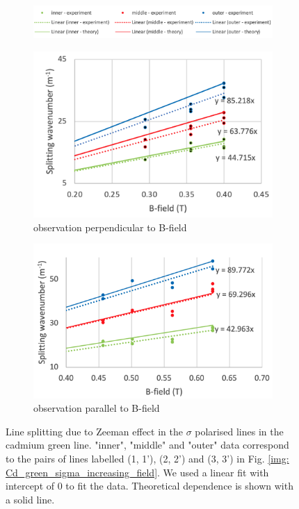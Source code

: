 \documentclass[11pt]{article}
\begin{document}
\begin{figure}[h!]
    \centering
        \begin{subfigure}{\linewidth}
        \includegraphics[width=\linewidth]{splitting graphs/legend.png}
    \end{subfigure}
    \begin{subfigure}{0.47\linewidth}
        \includegraphics[width=\linewidth]{splitting graphs/Cd green sigma perp gr.png}
        \caption{observation perpendicular to B-field}
        \label{fig: Cd green sig perp}
    \end{subfigure}
    \begin{subfigure}{0.47\linewidth}
        \includegraphics[width=\linewidth]{splitting graphs/Cd green sigma par gr.png}
        \caption{observation parallel to B-field}
        \label{fig: Cd green sig par}
    \end{subfigure}
    \caption{Line splitting due to Zeeman effect in the $\sigma$ polarised lines in the cadmium green line. "inner", "middle" and "outer" data correspond to the pairs of lines labelled (1, 1'), (2, 2') and (3, 3') in Fig. \ref{img: Cd_green_sigma_increasing_field}. We used a linear fit with intercept of 0 to fit the data. Theoretical dependence is shown with a solid line.}
    \label{fig: Cd green sig}
\end{figure}
\end{document}
